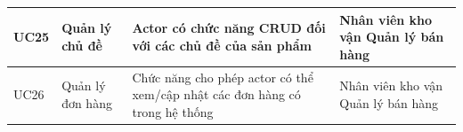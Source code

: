 \documentclass[12pt,a4paper,2sides]{report}
\begin{document}
\begin{tabular}{|p{1cm}|p{3cm}|p{6cm}|p{3cm}|}
\hline
UC25 & Quản lý chủ đề                         & Actor có chức năng CRUD đối với các chủ đề của sản phẩm                                                                                                                                                                                  & Nhân viên kho vận Quản lý bán hàng                                      \\ 
\hline
UC26 & Quản lý đơn hàng                       & Chức năng cho phép actor có thể xem/cập nhật các đơn hàng có trong hệ thống                                                                                                                                                              & Nhân viên kho vận Quản lý bán hàng                                      \\ 
\hline
\end{tabular}\\
\end{document}
